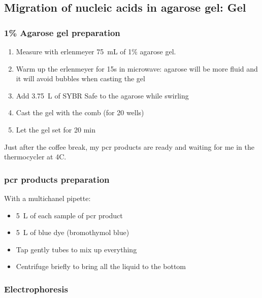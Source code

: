 \subsection{Migration of nucleic acids in agarose gel: Gel}
\label{task:20180211_cj2}

\subsubsection{1\% Agarose gel preparation}

\begin{enumerate}
\item Measure with erlenmeyer 75~mL of 1\% agarose gel.
\item Warm up the erlenmeyer for 15s in microwave: agarose will be more fluid and it will avoid bubbles when casting the gel
\item Add 3.75~\textmu L of SYBR Safe to the agarose while swirling 
\item Cast the gel with the comb (for 20 wells)
\item Let the gel set for 20 min
\end{enumerate}

Just after the coffee break, my \gls{pcr} products are ready and waiting for me in the thermocycler at 4\degree C. 

\subsubsection{\gls{pcr} products preparation}

With a multichanel pipette:
\begin{itemize}
\item 5~\textmu L of each sample of \gls{pcr} product
\item 5~\textmu L of blue dye (bromothymol blue)
\item Tap gently tubes to mix up everything
\item Centrifuge briefly to bring all the liquid to the bottom
\end{itemize}

\subsubsection{Electrophoresis}

